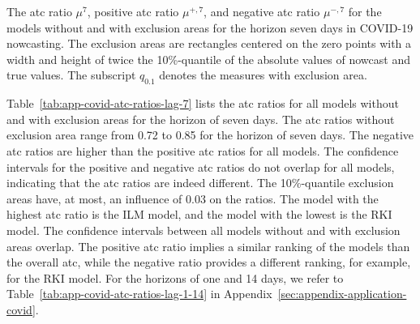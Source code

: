 \documentclass[pdflatex]{sn-jnl}
\theoremstyle{plain}%
\theoremstyle{definition}
\newcommand{\acc}{\mu}
\newcommand{\accl}[1][l]{\mu^{#1}}
\newcommand{\accpl}[1][l]{\acc^{+,#1}}
\newcommand{\accml}[1][l]{\acc^{-,#1}}
\begin{document}
\begin{table}
    \centering
    \tiny
    
    \caption[The ATC ratios for COVID-19 nowcasting.]{The \ac{atc} ratio $\accl[7]$, positive \ac{atc} ratio $\accpl[7]$, and negative \ac{atc} ratio $\accml[7]$ for the models without and with exclusion areas for the horizon seven days in COVID-19 nowcasting. The exclusion areas are rectangles centered on the zero points with a width and height of twice the 10\%-quantile of the absolute values of nowcast and true values. The subscript $q_{0.1}$ denotes the measures with exclusion area. }
    \label{tab:app-covid-atc-ratios-lag-7}
\end{table}

Table~\ref{tab:app-covid-atc-ratios-lag-7} lists the \ac{atc} ratios for all models without and with exclusion areas for the horizon of seven days.
The \ac{atc} ratios without exclusion area range from 0.72 to 0.85 for the horizon of seven days.
The negative \ac{atc} ratios are higher than the positive \ac{atc} ratios for all models.
The confidence intervals for the positive and negative \ac{atc} ratios do not overlap for all models, indicating that the \ac{atc} ratios are indeed different.
The 10\%-quantile exclusion areas have, at most, an influence of 0.03 on the ratios.
The model with the highest \ac{atc} ratio is the ILM model, and the model with the lowest is the RKI model.
The confidence intervals between all models without and with exclusion areas overlap.
The positive \ac{atc} ratio implies a similar ranking of the models than the overall \ac{atc}, while the negative ratio provides a different ranking, for example, for the RKI model.
For the horizons of one and 14 days, we refer to Table~\ref{tab:app-covid-atc-ratios-lag-1-14} in Appendix~\ref{sec:appendix-application-covid}.
\end{document}
